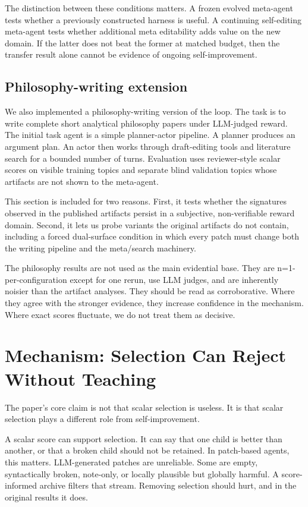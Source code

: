 \documentclass[11pt]{article}
\begin{document}
The distinction between these conditions matters. A frozen evolved meta-agent tests whether a previously constructed harness is useful. A continuing self-editing meta-agent tests whether additional meta editability adds value on the new domain. If the latter does not beat the former at matched budget, then the transfer result alone cannot be evidence of ongoing self-improvement.

\subsection{Philosophy-writing extension}\label{philosophy-writing-extension}

We also implemented a philosophy-writing version of the loop. The task is to write complete short analytical philosophy papers under LLM-judged reward. The initial task agent is a simple planner-actor pipeline. A planner produces an argument plan. An actor then works through draft-editing tools and literature search for a bounded number of turns. Evaluation uses reviewer-style scalar scores on visible training topics and separate blind validation topics whose artifacts are not shown to the meta-agent.

This section is included for two reasons. First, it tests whether the signatures observed in the published artifacts persist in a subjective, non-verifiable reward domain. Second, it lets us probe variants the original artifacts do not contain, including a forced dual-surface condition in which every patch must change both the writing pipeline and the meta/search machinery.

The philosophy results are not used as the main evidential base. They are n=1-per-configuration except for one rerun, use LLM judges, and are inherently noisier than the artifact analyses. They should be read as corroborative. Where they agree with the stronger evidence, they increase confidence in the mechanism. Where exact scores fluctuate, we do not treat them as decisive.

\section{Mechanism: Selection Can Reject Without Teaching}\label{mechanism-selection-can-reject-without-teaching}

The paper's core claim is not that scalar selection is useless. It is that scalar selection plays a different role from self-improvement.

A scalar score can support selection. It can say that one child is better than another, or that a broken child should not be retained. In patch-based agents, this matters. LLM-generated patches are unreliable. Some are empty, syntactically broken, note-only, or locally plausible but globally harmful. A score-informed archive filters that stream. Removing selection should hurt, and in the original results it does.
\end{document}
